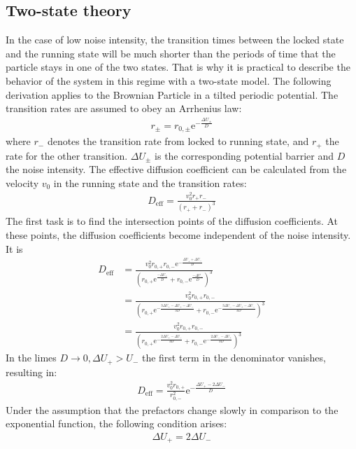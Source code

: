 \documentclass[12pt,a4paper]{article}
\begin{document}
\subsection{Two-state theory}
In the case of low noise intensity, the transition times between the locked state and the running state will be much shorter than the periods of time that the particle stays in one of the two states. That is why it is practical to describe the behavior of the system in this regime with a two-state model. The following derivation applies to the Brownian Particle in a tilted periodic potential. The transition rates are assumed to obey an Arrhenius law:
\begin{align*}
r_{\pm}=r_{0,\pm}\text{e}^{-\frac{\Delta U_{\pm}}{D}}
\end{align*}
where $r_-$ denotes the transition rate from locked to running state, and $r_+$ the rate for the other transition. $\Delta U_{\pm}$ is the corresponding potential barrier and $D$ the noise intensity. The effective diffusion coefficient can be calculated from the velocity $v_0$ in the running state and the transition rates: 
\begin{align*}
D_{\text{eff}}=\frac{v_0^2 r_+r_-}{(r_++r_-)^3}
\end{align*}
The first task is to find the intersection points of the diffusion coefficients. At these points, the diffusion coefficients become independent of the noise intensity.
It is
\begin{align*}
D_{\text{eff}}&=\frac{v_0^2r_{0,+}r_{0,-}\text{e}^{-\frac{\Delta U_++\Delta U_-}{D}}}{\left(r_{0,+}\text{e}^{\frac{-\Delta U_+}{D}}+r_{0,-}\text{e}^{\frac{-\Delta U_-}{D}}\right)^3}\\&=\frac{v_0^2r_{0,+}r_{0,-}}{\left(r_{0,+}\text{e}^{-\frac{3\Delta U_+-\Delta U_+-\Delta U_-}{3D}}+r_{0,-}\text{e}^{-\frac{3\Delta U_--\Delta U_+ -\Delta U_-}{3D}}\right)^3}\\&=\frac{v_0^2r_{0,+}r_{0,-}}{\left(r_{0,+}\text{e}^{-\frac{2\Delta U_+-\Delta U_-}{3D}}+r_{0,-}\text{e}^{-\frac{2\Delta U_--\Delta U_+}{3D}}\right)^3}
\end{align*}
In the limes $D\rightarrow 0,\Delta U_+>U_-$ the first term in the denominator vanishes, resulting in:
\begin{align*}
D_{\text{eff}}=\frac{v_0^2r_{0,+}}{r_{0,-}^2}\text{e}^{-\frac{\Delta U_+-2\Delta U_-}{D}}
\end{align*}
Under the assumption that the prefactors change slowly in comparison to the exponential function, the following condition arises:
\begin{align*}
\Delta U_+=2\Delta U_-
\end{align*}
\end{document}
